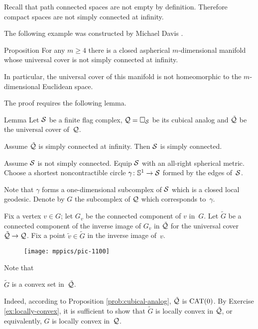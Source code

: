 Recall that path connected spaces are not empty by definition.
Therefore compact spaces are not simply connected at infinity.

The following example was constructed by Michael Davis \cite{davis-1983}.

\begin{thm}{Proposition}\label{prop:aspherical}
For any  $m\ge 4$ there is a closed aspherical 
$m$-dimensional manifold whose universal cover is not simply connected at infinity.

In particular, the universal cover of this manifold 
is not homeomorphic to the $m$-dimensional Euclidean space.
\end{thm}

The proof requires the following lemma.

\begin{thm}{Lemma}\label{lem:example-pi_infty}
Let $\mathcal{S}$ be a finite flag complex,
$\mathcal{Q}=\square_{\mathcal{S}}$ be its cubical analog
and $\tilde{\mathcal{Q}}$ be the universal cover of~$\mathcal{Q}$.

Assume  $\tilde{\mathcal{Q}}$ is simply connected at infinity.
Then $\mathcal{S}$ is simply connected.
\end{thm}

Assume $\mathcal{S}$ is not simply connected. Equip $\mathcal{S}$ with an all-right spherical metric.
Choose a shortest noncontractible circle $\gamma\colon\mathbb{S}^1\to\mathcal{S}$ formed by the edges of~$\mathcal{S}$.

Note that $\gamma$ forms a one-dimensional subcomplex of $\mathcal{S}$ which is a closed local geodesic.
Denote by $G$ the subcomplex of $\mathcal{Q}$ which corresponds to~$\gamma$.

Fix a vertex $v\in G$;
let $G_v$ be the connected component of $v$ in~$G$.
Let $\tilde G$ be a connected component of the inverse image of $G_v$ in $\tilde{\mathcal{Q}}$
for the universal cover $\tilde{\mathcal{Q}}\to \mathcal{Q}$.
Fix a point $\tilde v\in\tilde G$ in the inverse image of~$v$.

\begin{wrapfigure}{r}{25mm}
\vskip0mm
\centering
\texttt{[image: mppics/pic-1100]}
\end{wrapfigure}
 
Note that 
\begin{clm}{}\label{tilde-G-convex}
$\tilde G$ is a convex set in~$\tilde{\mathcal{Q}}$.
\end{clm}


Indeed, according to Proposition \ref{prob:cubical-analog},
$\tilde{\mathcal{Q}}$ is $\mathrm{CAT}(0)$.
By Exercise \ref{ex:locally-convex},
it is sufficient to show that $\tilde G$ is locally convex in $\tilde{\mathcal{Q}}$,
or equivalently, $G$ is locally convex in~$\mathcal{Q}$.

